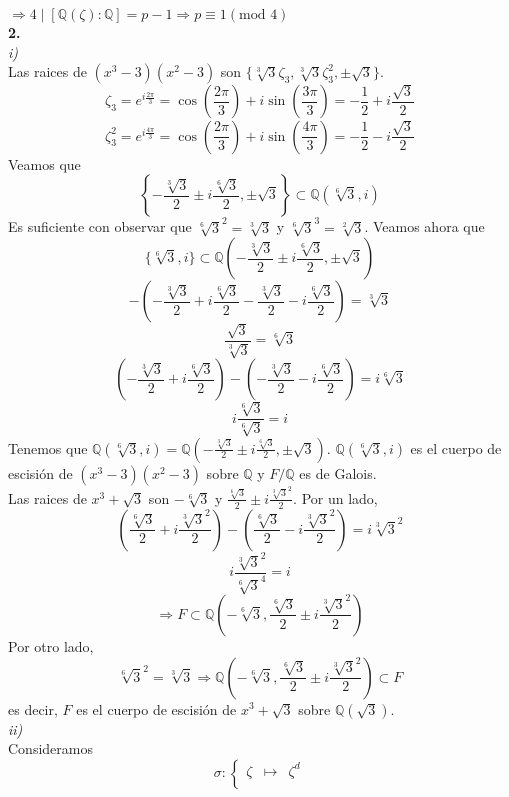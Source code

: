 \documentclass{article}
\newcommand{\bb}[1]{\mathbb{#1}}
\begin{document}
\begin{multicols}{2}
\begin{center}
\begin{tikzpicture}
  \end{tikzpicture}
\end{center}
$\Rightarrow 4\mid [\bb{Q}(\zeta):\bb{Q}] = p-1 \Rightarrow p \equiv 1 (\text{mod }4)$\\
\noindent\textbf{2.}\\
\textit{i)}\\
Las raices de $(x^3-3)(x^2-3)$ son $\{\sqrt[3]{3}\zeta_3, \sqrt[3]{3}\zeta_3^2, \pm \sqrt{3}\}$.
$$
\zeta_3 = e^{i\frac{2\pi}{3}} = \cos(\frac{2\pi}{3}) + i \sin(\frac{3\pi}{3}) = -\frac{1}{2} + i \frac{\sqrt{3}}{2}
$$
$$
\zeta_3^2 = e^{i\frac{4\pi}{3}} = \cos(\frac{2\pi}{3}) + i \sin(\frac{4\pi}{3}) = -\frac{1}{2} - i \frac{\sqrt{3}}{2}
$$
Veamos que
$$
\left\{ -\frac{\sqrt[3]{3}}{2} \pm i \frac{\sqrt[6]{3}}{2}, \pm \sqrt{3} \right\} \subset \bb{Q}(\sqrt[6]{3}, i)
$$
Es suficiente con observar que $\sqrt[6]{3}^2 = \sqrt[3]{3}$ y $\sqrt[6]{3}^3 = \sqrt[2]{3}$. Veamos ahora que
$$
\{ \sqrt[6]{3}, i \} \subset \bb{Q}\left( -\frac{\sqrt[3]{3}}{2} \pm i \frac{\sqrt[6]{3}}{2}, \pm \sqrt{3} \right)
$$
$$
-\left( -\frac{\sqrt[3]{3}}{2} + i \frac{\sqrt[6]{3}}{2} -\frac{\sqrt[3]{3}}{2} - i \frac{\sqrt[6]{3}}{2} \right) = \sqrt[3]{3}
$$
$$
\frac{\sqrt{3}}{\sqrt[3]{3}} = \sqrt[6]{3}
$$
$$
\left( -\frac{\sqrt[3]{3}}{2} + i \frac{\sqrt[6]{3}}{2} \right) - \left( -\frac{\sqrt[3]{3}}{2} - i \frac{\sqrt[6]{3}}{2} \right) = i \sqrt[6]{3}
$$
$$
i \frac{\sqrt[6]{3}}{\sqrt[6]{3}} = i
$$
Tenemos que $\bb{Q}(\sqrt[6]{3}, i) = \bb{Q}\left( -\frac{\sqrt[3]{3}}{2} \pm i \frac{\sqrt[6]{3}}{2}, \pm \sqrt{3} \right)$. $\bb{Q}(\sqrt[6]{3}, i)$ es el cuerpo de escisión de $(x^3-3)(x^2-3)$ sobre $\bb{Q}$ y $F/\bb{Q}$ es de Galois.\\
Las raices de $x^3 + \sqrt{3}$ son $-\sqrt[6]{3}$ y $\frac{\sqrt[6]{3}}{2} \pm i\frac{\sqrt[3]{3}^2}{2}$. Por un lado,
$$
\left( \frac{\sqrt[6]{3}}{2} + i\frac{\sqrt[3]{3}^2}{2} \right) - \left( \frac{\sqrt[6]{3}}{2} - i\frac{\sqrt[3]{3}^2}{2} \right) = i \sqrt[3]{3}^2
$$
$$
i \frac{\sqrt[3]{3}^2}{\sqrt[6]{3}^4} = i
$$
$$
\Rightarrow F \subset \bb{Q}\left( -\sqrt[6]{3}, \frac{\sqrt[6]{3}}{2} \pm i\frac{\sqrt[3]{3}^2}{2} \right)
$$
Por otro lado,
$$
\sqrt[6]{3}^2 = \sqrt[3]{3} \Rightarrow \bb{Q}\left( -\sqrt[6]{3}, \frac{\sqrt[6]{3}}{2} \pm i\frac{\sqrt[3]{3}^2}{2} \right) \subset F
$$
es decir, $F$ es el cuerpo de escisión de $x^3 + \sqrt{3}$ sobre $\bb{Q}(\sqrt{3})$.\\
\textit{ii)}\\
Consideramos
$$
\sigma :
\left\{\begin{array}{ccc}
    \zeta & \longmapsto & \zeta^d\\

\end{array}$$
\end{multicols}
\end{document}
